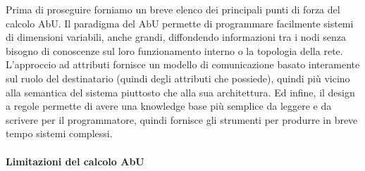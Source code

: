 \documentclass[12pt, a4paper]{article}
\begin{document}
Prima di proseguire forniamo un breve elenco dei principali punti di forza del calcolo AbU. Il paradigma del AbU permette di programmare facilmente sistemi di dimensioni variabili, anche grandi, diffondendo informazioni tra i nodi senza bisogno di conoscenze sul loro funzionamento interno o la topologia della rete.
L'approccio ad attributi fornisce un modello di comunicazione basato interamente sul ruolo del destinatario (quindi degli attributi che possiede), quindi più vicino alla semantica del sistema piuttosto che alla sua architettura.
Ed infine, il design a regole permette di avere una knowledge base più semplice da leggere e da scrivere per il programmatore, quindi fornisce gli strumenti per produrre in breve tempo sistemi complessi.

\paragraph{Limitazioni del calcolo AbU}
\end{document}
